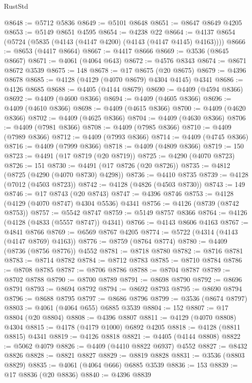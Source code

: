 \begin{lexlean}{RustStd}
\begin{coremodule}
@8648 := @5712 @5836
@8649 := @5101 @8648
@8651 := @8647 @8649 @4205
@8653 := @5149 @8651 @4595
@8654 := @4238 @22
@8664 := @4137 @8654 (@5724 (@5835 (@4143 (@4147 @4200) (@4143 (@4147 @4145) @4163))))
@8666 := @8653 (@4417 @8664)
@8667 := @4417 @8666
@8669 := @3536 (@8645 @8667)
@8671 := @4061 (@4064 @643)
@8672 := @4576 @8343
@8674 := @8671 @8672 @3539
@8675 := 148
@8678 := @17 @8675 (@20 @8675)
@8679 := @4396 @8678
@8685 := @4128 (@4129 (@4070 @8679) @4304 @4145) @4341
@8686 := @4126 @8685
@8688 := @4405 (@4144 @8679)
@8690 := @4409 (@4594 @8366)
@8692 := @4409 (@4600 @8366)
@8694 := @4409 (@4605 @8366)
@8696 := @4409 (@4610 @8366)
@8698 := @4409 (@4615 @8366)
@8700 := @4409 (@4620 @8366)
@8702 := @4409 (@4625 @8366)
@8704 := @4409 (@4630 @8366)
@8706 := @4409 (@7981 @8366)
@8708 := @4409 (@7985 @8366)
@8710 := @4409 (@7989 @8366)
@8712 := @4409 (@7993 @8366)
@8714 := @4409 (@4745 @8366)
@8716 := @4409 (@7999 @8366)
@8718 := @4409 (@4809 @8366)
@8719 := 150
@8723 := @4491 (@17 @8719 (@20 @8719))
@8725 := @4290 (@4070 @8723)
@8726 := 151
@8730 := @4491 (@17 @8726 (@20 @8726))
@8735 := @4812 (@8725 (@4290 (@4070 @8730) @4298))
@8736 := @4410 @8735
@8739 := @4128 (@7012 (@4503 @8723))
@8742 := @4128 (@4826 (@4503 @8730))
@8743 := 149
@8746 := @17 @8743 (@20 @8743)
@8747 := @4396 @8746
@8753 := @4128 (@4129 (@4070 @8747) @4304 @5536) @4341
@8756 := @4126 (@8739 (@8742 @8753))
@8757 := @5542 @8747
@8759 := @5149 @8757 @8366
@8764 := @4126 (@4128 (@4833 (@5557 @8747)) @4341)
@8766 := @4143 @8606 @4163
@8767 := @4841 @8766
@8769 := @6569 @8767 @4205
@8774 := @5722 (@4314 (@4143 (@4147 @8769) @4163))
@8776 := @8759 (@8764 @8774)
@8780 := @4409 (@8736 (@8756 @8776)) @4552
@8781 := @8718 @8780
@8782 := @8716 @8781
@8783 := @8714 @8782
@8784 := @8712 @8783
@8785 := @8710 @8784
@8786 := @8708 @8785
@8787 := @8706 @8786
@8788 := @8704 @8787
@8789 := @8702 @8788
@8790 := @8700 @8789
@8791 := @8698 @8790
@8792 := @8696 @8791
@8793 := @8694 @8792
@8794 := @8692 @8793
@8795 := @8690 @8794
@8796 := @8688 @8795
@8797 := @8686 @8796
@8799 := @3536 (@8674 @8797)
@8803 := @4061 (@4064 @655) @6885 @3539
@8804 := 152
@8807 := @17 @8804 (@20 @8804)
@8808 := @4396 @8807
@8811 := @4129 (@4070 @8808) @4304
@8815 := @4178 (@4179 @1000) @6892 @4205
@8818 := @4128 (@8811 @8815) @4341
@8819 := @4126 @8818
@8821 := @4405 (@4144 @8808)
@8822 := @5062 @4079
@8826 := @4409 (@4410 @8822 @6937) @4552
@8827 := @8432 @8826
@8828 := @8821 @8827
@8829 := @8819 @8828
@8831 := @3536 (@8803 @8829)
@8835 := @4061 (@4064 @666) @6885 @3539
@8836 := 153
@8839 := @17 @8836 (@20 @8836)
@8840 := @4396 @8839

\end{coremodule}
\end{lexlean}
